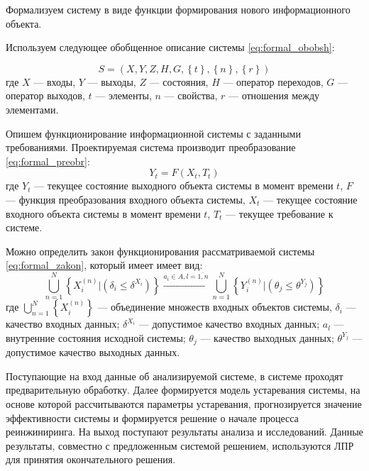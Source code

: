 Формализуем систему в виде функции формирования нового информационного объекта.

Используем следующее обобщенное описание системы \ref{eq:formal_obobsh}: 

\begin{equation}
    \label{eq:formal_obobsh}
    S=(X,Y,Z,H,G, \left\{ t \right\}, \left\{ n \right\}, \left\{ r \right\} )
\end{equation}
где $X$ --- входы,
$Y$ --- выходы,
$Z$ --- состояния,
$H$ --- оператор переходов,
$G$ --- оператор выходов,
$t$ --- элементы,
$n$ --- свойства,
$r$ --- отношения между элементами.

Опишем функционирование информационной системы с заданными требованиями. 
Проектируемая система производит преобразование \ref{eq:formal_preobr}:
\begin{equation}
    \label{eq:formal_preobr}
    Y_t=F(X_t,T_t)
\end{equation} 
где $Y_t$ --- текущее состояние выходного объекта системы в момент времени $t$,
$F$ --- функция преобразования входного объекта системы,
$X_t$ --- текущее состояние входного объекта системы в момент времени $t$,
$T_t$ --- текущее требование к системе.

Можно определить закон функционирования рассматриваемой системы \ref{eq:formal_zakon}, который имеет имеет вид: 
\begin{equation}
    \label{eq:formal_preobr}
    \bigcup_{n=1}^N \left\{ X_i^{(n)} | (\delta_i \leq \delta^{X_i}) \right\}
    \xrightarrow{a_i \in A, l=\overline{1,n}}
    \bigcup_{n=1}^N \left\{ Y_i^{(n)} | (\theta_j \leq \theta^{Y_j}) \right\}
\end{equation} 
где $\bigcup_{n=1}^N \left\{ X_i^{(n)} \right\}$ --- объединение множеств входных объектов системы,
$\delta_i$ --- качество входных данных;
$\delta^{X_i}$ --- допустимое качество входных данных; 
$a_l$ --- внутренние состояния исходной системы; 
$\theta_j$ --- качество выходных данных;
$\theta^{Y_j}$ --- допустимое качество выходных данных. 

Поступающие на вход данные об анализируемой системе, в системе проходят предварительную обработку. 
Далее формируется модель устаревания системы, на основе которой рассчитываются параметры устаревания, прогнозируется значение эффективности системы и формируется решение о начале процесса реинжиниринга. 
На выход поступают результаты анализа и исследований. 
Данные результаты, совместно с предложенным системой решением, используются ЛПР для принятия окончательного решения.

